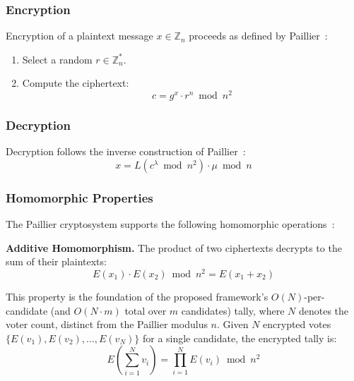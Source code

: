 \subsubsection{Encryption}
\label{subsubsec:paillier-enc}

Encryption of a plaintext message $x \in \mathbb{Z}_n$ proceeds as defined by Paillier~\cite{paillier1999}:
\begin{enumerate}
    \item Select a random $r \in \mathbb{Z}_n^*$.
    \item Compute the ciphertext:
    \begin{equation}
        c = g^x \cdot r^n \bmod n^2
        \label{eq:paillier-enc}
    \end{equation}
\end{enumerate}

\subsubsection{Decryption}
\label{subsubsec:paillier-dec}

Decryption follows the inverse construction of Paillier~\cite{paillier1999}:
\begin{equation}
    x = L(c^\lambda \bmod n^2) \cdot \mu \bmod n
    \label{eq:paillier-dec}
\end{equation}

\subsubsection{Homomorphic Properties}
\label{subsubsec:paillier-homo}

The Paillier cryptosystem supports the following homomorphic operations~\cite{paillier1999}:

\textbf{Additive Homomorphism.} The product of two ciphertexts decrypts to the sum of their plaintexts:
\begin{equation}
    E(x_1) \cdot E(x_2) \bmod n^2 = E(x_1 + x_2)
    \label{eq:homo-add}
\end{equation}

This property is the foundation of the proposed framework's $O(N)$-per-candidate (and $O(N \cdot m)$ total over $m$ candidates) tally, where $N$ denotes the voter count, distinct from the Paillier modulus $n$. Given $N$ encrypted votes $\{E(v_1), E(v_2), \ldots, E(v_N)\}$ for a single candidate, the encrypted tally is:
\begin{equation}
    E\left(\sum_{i=1}^{N} v_i\right) = \prod_{i=1}^{N} E(v_i) \bmod n^2
    \label{eq:tally}
\end{equation}

